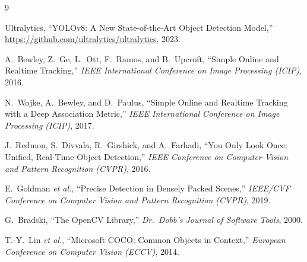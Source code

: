 \documentclass[12pt,a4paper]{article}
\begin{document}
\begin{thebibliography}{9}

Ultralytics,
``YOLOv8: A New State-of-the-Art Object Detection Model,''
\url{https://github.com/ultralytics/ultralytics}, 2023.

A.~Bewley, Z.~Ge, L.~Ott, F.~Ramos, and B.~Upcroft,
``Simple Online and Realtime Tracking,''
\textit{IEEE International Conference on Image Processing (ICIP)}, 2016.

N.~Wojke, A.~Bewley, and D.~Paulus,
``Simple Online and Realtime Tracking with a Deep Association Metric,''
\textit{IEEE International Conference on Image Processing (ICIP)}, 2017.

J.~Redmon, S.~Divvala, R.~Girshick, and A.~Farhadi,
``You Only Look Once: Unified, Real-Time Object Detection,''
\textit{IEEE Conference on Computer Vision and Pattern Recognition (CVPR)}, 2016.

E.~Goldman \textit{et al.},
``Precise Detection in Densely Packed Scenes,''
\textit{IEEE/CVF Conference on Computer Vision and Pattern Recognition (CVPR)}, 2019.

G.~Bradski,
``The OpenCV Library,''
\textit{Dr.\ Dobb's Journal of Software Tools}, 2000.

T.-Y.~Lin \textit{et al.},
``Microsoft COCO: Common Objects in Context,''
\textit{European Conference on Computer Vision (ECCV)}, 2014.

\end{thebibliography}
\end{document}
